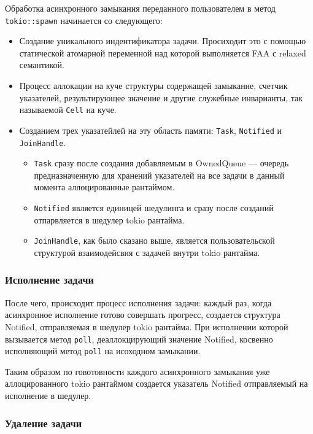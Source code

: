 Обработка асинхронного замыкания переданного пользователем в метод \verb|tokio::spawn| начинается со следующего:

\begin{itemize}
    \item Создание уникального индентификатора задачи. Просиходит это с помощью статической атомарной переменной над которой выполняется FAA с relaxed семантикой.
    \item Процесс аллокации на куче структуры содержащей замыкание, счетчик указателей, результирующее значение и другие служебные инварианты, так называемой \verb|Cell| на куче.
    \item Созданием трех указатейлей на эту область памяти: \verb|Task|, \verb|Notified| и \verb|JoinHandle|.
    \begin{itemize}
        \item \verb|Task| сразу после создания добавляемым в OwnedQueue --- очередь предназначенную для хранений указателей на все задачи в данный момента аллоцированные рантаймом.
        \item \verb|Notified| является единицей шедулинга и сразу после созданий отпарвляется в шедулер tokio рантайма.
        \item \verb|JoinHandle|, как было сказано выше, является пользовательской структурой взаимодейсвия с задачей внутри tokio рантайма.
    \end{itemize}
\end{itemize}

\subsubsection{Исполнение задачи}

После чего, происходит процесс исполнения задачи: каждый раз, когда асинхронное исполнение готово совершать прогресс, создается структура Notified, отправляемая в шедулер tokio рантайма. При исполнении которой вызывается метод \verb|poll|, деаллокцирующий значение Notified, косвенно исполняющий метод \verb|poll| на исоходном замыкании.

Таким образом по говотовности каждого асинхронного замыкания уже аллоцированного tokio рантаймом создается указатель Notified отправляемый на исполнение в шедулер.

\subsubsection{Удаление задачи}

